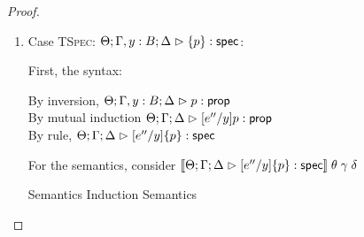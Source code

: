 \begin{proof}
\begin{enumerate}
  For semantics, consider $\interp{\judgeS[\Theta; \Gamma; \Delta]{[e''/y](S \oplus S')}}\;\theta\;\gamma\;\delta$
  \begin{eqnproof}
    {Semantics}
    {Induction}
          {Semantics}
  \end{eqnproof}

\item Case \textsc{TSpec}: $\judgeS[\Theta; \Gamma, y:B; \Delta]{\setof{p}}$:
  
  First, the syntax:
  \begin{tabbedproof}
    \oo By inversion, $\judgeA[\Theta; \Gamma, y:B; \Delta]{p}{\assert}$ \\
    \oo By mutual induction $\judgeA[\Theta; \Gamma; \Delta]{[e''/y]p}{\assert}$\\
    \oo By rule, $\judgeS[\Theta; \Gamma; \Delta]{[e''/y]\setof{p}}$
  \end{tabbedproof}

  For the semantics, consider $\interp{\judgeS[\Theta; \Gamma; \Delta]{[e''/y]\setof{p}}}\;\theta\;\gamma\;\delta$ 
  \begin{eqnproof}
          {Semantics}
          {Induction}
          {Semantics}
  \end{eqnproof}
\end{enumerate}


\end{proof}
